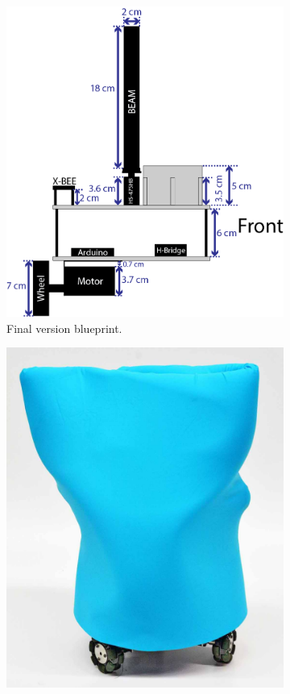 \begin{figure}[h]
\begin{subfigure}[c]{0.3\textwidth}
	\includegraphics[width=\textwidth]{./Images/upperFirstB.png}
	\caption{Final version blueprint.}
	\label{fig:triskar-prototype}
	\end{subfigure}
	\begin{subfigure}[c]{0.3\textwidth}
	\centering
	\includegraphics[width=\textwidth]{./Images/Triskar2.jpg}

\end{subfigure}
\end{figure}
